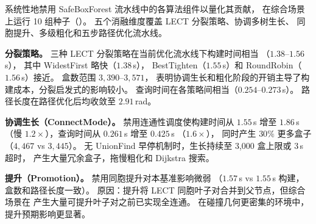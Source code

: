 \documentclass[journal]{IEEEtran}
\begin{document}
系统性地禁用 SafeBoxForest 流水线中的各算法组件以量化其贡献，
在综合场景上运行 10 组种子（）。
五个消融维度覆盖 LECT 分裂策略、协调多树生长、
同胞提升、多级粗化和五步路径优化流水线。

\begin{table}[ht]
\centering
\caption{消融实验（IIWA14，综合场景，10 种子）。
每行从 Full 基线中禁用一个组件。
Split：LECT 分裂策略变体。}
\label{tab:ablation}
\end{table}

\textbf{分裂策略。}
三种 LECT 分裂策略在当前优化流水线下构建时间相当
（$1.38$--$1.56$\,s），
其中 WidestFirst 略快（$1.38$\,s），
BestTighten（$1.55$\,s）和 RoundRobin（$1.56$\,s）接近。
盒数范围 $3{,}390$--$3{,}571$，
表明协调生长和粗化阶段的开销主导了构建成本，分裂启发式的影响较小。
查询时间在各策略间相当（$0.254$--$0.273$\,s）。
路径长度在路径优化后均收敛至 $2.91$\,rad。

\textbf{协调生长（ConnectMode）。}
禁用连通性调度使构建时间从 $1.55$\,s 增至 $1.86$\,s
（慢 $1.2{\times}$），查询时间从 $0.261$\,s 增至 $0.425$\,s
（$1.6{\times}$），
同时产生 $30\%$ 更多盒子（$4{,}467$ vs $3{,}445$）。
无 UnionFind 早停机制时，生长持续至 3{,}000 盒上限或 3\,s 超时，
产生大量冗余盒子，拖慢粗化和 Dijkstra 搜索。

\textbf{提升（Promotion）。}
禁用同胞提升对本基准影响微弱
（$1.57$\,s vs $1.55$\,s 构建，盒数和路径长度一致）。
原因：提升将 LECT 同胞叶子对合并到父节点，但综合场景在
产生大量可提升叶子对之前已实现全连通。
在碰撞几何更密集的环境中，提升预期影响更显著。
\end{document}
